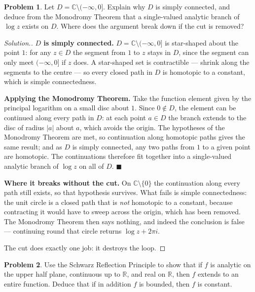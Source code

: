 \documentclass[11pt,a4paper]{article}
\theoremstyle{definition}
\newtheorem{problemx}{Problem}[section]
\newenvironment{problem}{\begin{problemx}}{\end{problemx}}
\newenvironment{solution}
  {\renewcommand{\qedsymbol}{}\begin{proof}[\textit{Solution}.]}
  {\end{proof}}
\begin{document}
\begin{problem}
Let $D = \mathbb{C}\setminus(-\infty, 0]$. Explain why $D$ is simply connected,
and deduce from the Monodromy Theorem that a single-valued analytic branch of
$\log z$ exists on $D$. Where does the argument break down if the cut is removed?
\end{problem}

\begin{solution}
\textbf{$D$ is simply connected.} $D = \mathbb{C}\setminus(-\infty,0]$ is
star-shaped about the point $1$: for any $z \in D$ the segment from $1$ to $z$
stays in $D$, since the segment can only meet $(-\infty,0]$ if $z$ does. A
star-shaped set is contractible --- shrink along the segments to the centre --- so
every closed path in $D$ is homotopic to a constant, which is simple connectedness.

\textbf{Applying the Monodromy Theorem.} Take the function element given by the
principal logarithm on a small disc about $1$. Since $0 \notin D$, the element can
be continued along every path in $D$: at each point $a \in D$ the branch extends to
the disc of radius $\left|a\right|$ about $a$, which avoids the origin. The
hypotheses of the Monodromy Theorem are met, so continuation along homotopic paths
gives the same result; and as $D$ is simply connected, any two paths from $1$ to a
given point are homotopic. The continuations therefore fit together into a
single-valued analytic branch of $\log z$ on all of $D$. $\blacksquare$

\textbf{Where it breaks without the cut.} On $\mathbb{C}\setminus\{0\}$ the
continuation along every path still exists, so that hypothesis survives. What fails
is simple connectedness: the unit circle is a closed path that is \emph{not}
homotopic to a constant, because contracting it would have to sweep across the
origin, which has been removed. The Monodromy Theorem then says nothing, and indeed
the conclusion is false --- continuing round that circle returns $\log z + 2\pi i$.

The cut does exactly one job: it destroys the loop.
\end{solution}


\begin{problem}
Use the Schwarz Reflection Principle to show that if $f$ is analytic on the upper
half plane, continuous up to $\mathbb{R}$, and real on $\mathbb{R}$, then $f$
extends to an entire function. Deduce that if in addition $f$ is bounded, then
$f$ is constant.
\end{problem}
\end{document}
